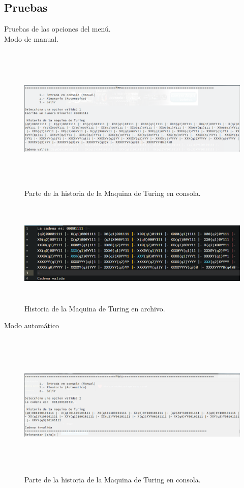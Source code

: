 	\subsection{Pruebas}
	Pruebas de las opciones del menú.
	\\
	{\large Modo de manual.}
	\begin{figure}[H]
		\begin{center}
			\includegraphics[width=\linewidth, height=7cm]{img/turing-manual-consola.png}
			\caption{Parte de la historia de la Maquina de Turing en consola.}
			\label{fig:turing1}
		\end{center}
	\end{figure}
	\begin{figure}[H]
		\begin{center}
			\includegraphics[width=\linewidth, height=5cm]{img/turing-manual-archivo.png}
			\caption{Historia de la Maquina de Turing en archivo.}
			\label{fig:turing2}
		\end{center}
	\end{figure}
	\newpage
	{\large Modo automático}
	\begin{figure}[H]
		\begin{center}
			\includegraphics[width=\linewidth, height=7cm]{img/turing-automatico-consola.png}
			\caption{Parte de la historia de la Maquina de Turing en consola.}
			\label{fig:turing3}
		\end{center}
	\end{figure}
